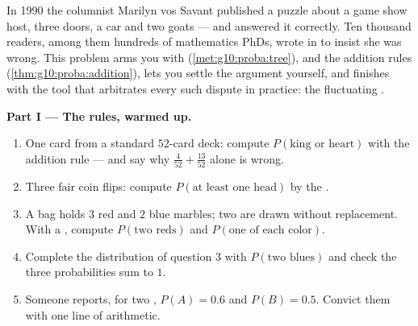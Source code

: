 \begin{problem}
\label{pb:g10:proba:1}
In 1990 the columnist Marilyn vos Savant published a puzzle about
a game show host, three doors, a car and two goats --- and
answered it correctly. Ten thousand readers, among them hundreds
of mathematics PhDs, wrote in to insist she was wrong. This
problem arms you with  (\cref{met:g10:proba:tree}),
 and the addition rules
(\cref{thm:g10:proba:addition}), lets you settle the argument
yourself, and finishes with the tool that arbitrates every such
dispute in practice: the fluctuating .

\medskip
\noindent\textbf{Part I --- The rules, warmed up.}
\begin{enumerate}
  \item One card from a standard $52$-card deck: compute
        $P(\text{king or heart})$ with the addition rule ---
        and say why $\frac{4}{52} + \frac{13}{52}$ alone is
        wrong.
  \item Three fair coin flips: compute $P(\text{at least one
        head})$ by the .
  \item A bag holds $3$ red and $2$ blue marbles; two are drawn
        without replacement. With a , compute
        $P(\text{two reds})$ and $P(\text{one of each color})$.
  \item Complete the distribution of question 3 with
        $P(\text{two blues})$ and check the three probabilities
        sum to $1$.
  \item Someone reports, for two \emph{} ,
        $P(A) = 0.6$ and $P(B) = 0.5$. Convict them with one
        line of arithmetic.
\end{enumerate}


\end{problem}
